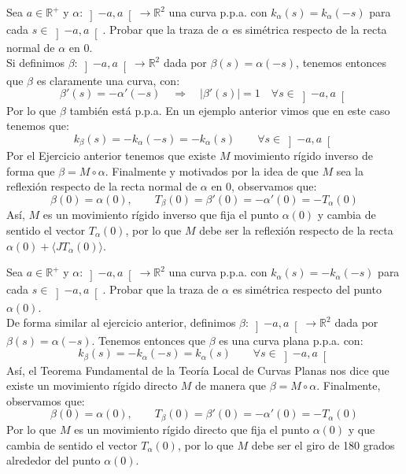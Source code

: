 \begin{ejercicio}
    Sea $a\in \mathbb{R}^+$ y $\alpha:\left]-a,a\right[\to\mathbb{R}^2$ una curva p.p.a. con $k_\alpha(s) = k_\alpha(-s)$  para cada $s\in \left]-a,a\right[$. Probar que la traza de $\alpha$ es simétrica respecto de la recta normal de $\alpha$ en $0$.\\

    \noindent
    Si definimos $\beta:\left]-a,a\right[\to\mathbb{R}^2$ dada por $\beta(s) = \alpha(-s)$, tenemos entonces que $\beta$ es claramente una curva, con:
    \begin{equation*}
        \beta'(s) = -\alpha'(-s) \quad\Longrightarrow\quad |\beta'(s)| = 1 \quad \forall s\in \left]-a,a\right[
    \end{equation*}
    Por lo que $\beta$ también está p.p.a. En un ejemplo anterior vimos que en este caso tenemos que:
    \begin{equation*}
        k_\beta(s) = -k_\alpha(-s) = -k_{\alpha}(s) \qquad \forall s\in \left]-a,a\right[
    \end{equation*}
    Por el Ejercicio anterior tenemos que existe $M$ movimiento rígido inverso de forma que $\beta = M\circ \alpha$. Finalmente y motivados por la idea de que $M$ sea la reflexión respecto de la recta normal de $\alpha$ en $0$, observamos que:
    \begin{equation*}
        \beta(0) = \alpha(0), \qquad T_\beta(0) = \beta'(0) = -\alpha'(0) = -T_\alpha(0)
    \end{equation*}
    Así, $M$ es un movimiento rígido inverso que fija el punto $\alpha(0)$ y cambia de sentido el vector $T_\alpha(0)$, por lo que $M$ debe ser la reflexión respecto de la recta $\alpha(0) + \langle JT_\alpha(0) \rangle $.
\end{ejercicio}

\begin{ejercicio}
    Sea $a\in \mathbb{R}^+$ y $\alpha:\left]-a,a\right[\to\mathbb{R}^2$ una curva p.p.a. con $k_\alpha(s) = -k_\alpha(-s)$ para cada $s\in \left]-a,a\right[$. Probar que la traza de $\alpha$ es simétrica respecto del punto $\alpha(0)$.\\

    \noindent
    De forma similar al ejercicio anterior, definimos $\beta:\left]-a,a\right[\to\mathbb{R}^2$ dada por $\beta(s) = \alpha(-s)$. Tenemos entonces que $\beta$ es una curva plana p.p.a. con:
    \begin{equation*}
        k_\beta(s) = -k_\alpha(-s) = k_\alpha(s) \qquad \forall s\in \left]-a,a\right[
    \end{equation*}
    Así, el Teorema Fundamental de la Teoría Local de Curvas Planas nos dice que existe un movimiento rígido directo $M$ de manera que $\beta = M\circ \alpha$. Finalmente, observamos que:
    \begin{equation*}
        \beta(0) = \alpha(0), \qquad T_\beta(0) = \beta'(0) = -\alpha'(0) = -T_\alpha(0)
    \end{equation*}
    Por lo que $M$ es un movimiento rígido directo que fija el punto $\alpha(0)$ y que cambia de sentido el vector $T_\alpha(0)$, por lo que $M$ debe ser el giro de 180 grados alrededor del punto $\alpha(0)$.
\end{ejercicio}

